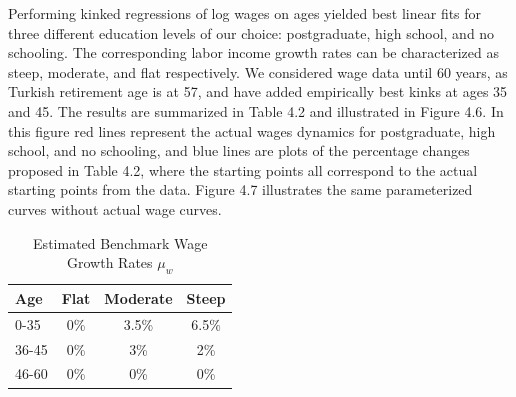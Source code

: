 Performing kinked regressions of log wages on ages yielded best linear fits for three different education levels of our choice: postgraduate, high school, and no schooling. The corresponding labor income growth rates can be characterized as steep, moderate, and flat respectively. We considered wage data until 60 years, as Turkish retirement age is at 57, and have added empirically best kinks at ages 35 and 45. The results are summarized in Table 4.2 and illustrated in Figure 4.6. In this figure red lines represent the actual wages dynamics for postgraduate, high school, and no schooling, and blue lines are plots of the percentage changes proposed in Table 4.2, where the starting points all correspond to the actual starting points from the data. Figure 4.7 illustrates the same parameterized curves without actual wage curves. 

\begin{table}
	\centering
	\caption{Estimated Benchmark Wage Growth Rates $\mu_w$}
	\begin{tabular}[c]{l|ccc}
		Age&Flat&Moderate&Steep\\
		\hline
		0-35&0\%&3.5\%&6.5\%\\
		36-45&0\%&3\%&2\%\\
		46-60&0\%&0\%&0\%\\
	\end{tabular}
\end{table}


